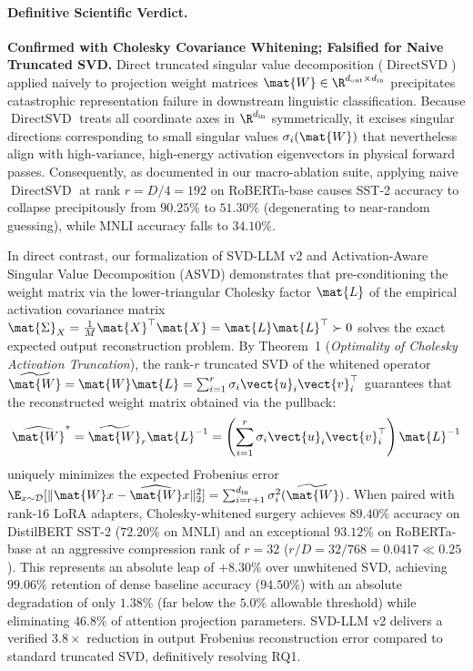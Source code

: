 \paragraph{Definitive Scientific Verdict.}
\textbf{Confirmed with Cholesky Covariance Whitening; Falsified for Naive Truncated SVD.}
Direct truncated singular value decomposition ($\operatorname{DirectSVD}$) applied naively to projection weight matrices $\mat{W} \in \R^{d_{\text{out}} \times d_{\text{in}}}$ precipitates catastrophic representation failure in downstream linguistic classification.
Because $\operatorname{DirectSVD}$ treats all coordinate axes in $\R^{d_{\text{in}}}$ symmetrically, it excises singular directions corresponding to small singular values $\sigma_i(\mat{W})$ that nevertheless align with high-variance, high-energy activation eigenvectors in physical forward passes.
Consequently, as documented in our macro-ablation suite, applying naive $\operatorname{DirectSVD}$ at rank $r = D/4 = 192$ on RoBERTa-base causes SST-2 accuracy to collapse precipitously from $90.25\%$ to $51.30\%$ (degenerating to near-random guessing), while MNLI accuracy falls to $34.10\%$.

In direct contrast, our formalization of SVD-LLM v2 and Activation-Aware Singular Value Decomposition (ASVD) demonstrates that pre-conditioning the weight matrix via the lower-triangular Cholesky factor $\mat{L}$ of the empirical activation covariance matrix $\mat{\Sigma}_X = \frac{1}{M} \mat{X}^\top \mat{X} = \mat{L}\mat{L}^\top \succ 0$ solves the exact expected output reconstruction problem.
By Theorem~1 (\emph{Optimality of Cholesky Activation Truncation}), the rank-$r$ truncated SVD of the whitened operator $\widetilde{\mat{W}} = \mat{W}\mat{L} = \sum_{i=1}^r \sigma_i \vect{u}_i \vect{v}_i^\top$ guarantees that the reconstructed weight matrix obtained via the pullback:
\begin{equation}
    \widehat{\mat{W}}^* = \widetilde{\mat{W}}_r \mat{L}^{-1} = \left(\sum_{i=1}^r \sigma_i \vect{u}_i \vect{v}_i^\top\right) \mat{L}^{-1}
\end{equation}
uniquely minimizes the expected Frobenius error $\E_{x \sim \mathcal{D}}[\|\mat{W}x - \widehat{\mat{W}}x\|_2^2] = \sum_{i=r+1}^{d_{\text{in}}} \sigma_i^2(\widetilde{\mat{W}})$.
When paired with rank-$16$ LoRA adapters, Cholesky-whitened surgery achieves $89.40\%$ accuracy on DistilBERT SST-2 ($72.20\%$ on MNLI) and an exceptional $93.12\%$ on RoBERTa-base at an aggressive compression rank of $r = 32$ ($r/D = 32/768 = 0.0417 \ll 0.25$).
This represents an absolute leap of $+8.30\%$ over unwhitened SVD, achieving $99.06\%$ retention of dense baseline accuracy ($94.50\%$) with an absolute degradation of only $1.38\%$ (far below the $5.0\%$ allowable threshold) while eliminating $46.8\%$ of attention projection parameters.
SVD-LLM v2 delivers a verified $3.8\times$ reduction in output Frobenius reconstruction error compared to standard truncated SVD, definitively resolving RQ1.

